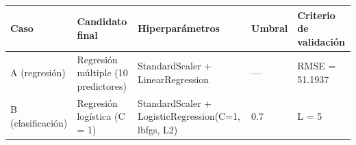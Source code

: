 \begin{tabular}{lllll}
\toprule
Caso & Candidato final & Hiperparámetros & Umbral & Criterio de validación \\
\midrule
A (regresión) & Regresión múltiple (10 predictores) & StandardScaler + LinearRegression & — & RMSE = 51.1937 \\
B (clasificación) & Regresión logística (C = 1) & StandardScaler + LogisticRegression(C=1, lbfgs, L2) & 0.7 & L = 5 \\
\bottomrule
\end{tabular}
